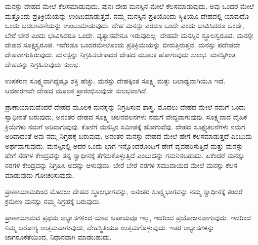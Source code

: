 ಮನಸ್ಸು ದೇಹದ ಮೇಲೆ ಕೆಲಸಮಾಡುವುದು, ಪುನಃ ದೇಹ ಮನಸ್ಸಿನ ಮೇಲೆ ಕೆಲಸಮಾಡುವುದು, ಅವು ಒಂದರ ಮೇಲೆ ಮತ್ತೊಂದು ಪ್ರತಿಕ್ರಿಯೆಯನ್ನು ಉಂಟುಮಾಡುತ್ತವೆ. ನಮ್ಮ ಮನಸ್ಸಿನ ಪ್ರತಿಯೊಂದು ಸ್ಥಿತಿಯೂ ದೇಹದಲ್ಲಿ ಯಾವುದೊ ಒಂದು ಬದಲಾವಣೆಯನ್ನು ಉಂಟುಮಾಡುವುದು. ದೇಹ ಮನಸ್ಸು ಎರಡೂ ಒಂದೇ ಎಂದು ಭಾವಿಸಿದರೂ ಒಂದೇ, ಬೇರೆ ಬೇರೆ ಎಂದು ಭಾವಿಸಿದರೂ ಒಂದೇ. ವ್ಯತ್ಯಾಸವೇನೂ ಇರುವುದಿಲ್ಲ. ದೇಹವೇ ಮನಸ್ಸಿನ ಸ್ಥೂಲಸ್ವರೂಪ. ಮನಸ್ಸೇ ದೇಹದ ಸೂಕ್ಷ್ಮಸ್ವರೂಪ. ಇವೆರಡೂ ಒಂದರಮೇಲೊಂದು ಪ್ರತಿಕ್ರಿಯೆಯನ್ನು ಬೀರುತ್ತಿರುತ್ತವೆ. ಮನಸ್ಸು ಪದೇಪದೇ ದೇಹವಾಗುತ್ತಿರುವುದು. ಮನಸ್ಸನ್ನು ನಿಗ್ರಹಿಸಬೇಕಾದರೆ ದೇಹದ ಮೂಲಕ ಹೋಗುವುದು ಸುಲಭ. ಮನಸ್ಸಿಗಿಂತ ದೇಹವನ್ನು ನಿಗ್ರಹಿಸುವುದು ಸುಲಭ.

ಉಪಕರಣ ಸೂಕ್ಷ್ಮವಾಗಿದ್ದಷ್ಟೂ ಶಕ್ತಿ ಹೆಚ್ಚು. ಮನಸ್ಸು ದೇಹಕ್ಕಿಂತ ಸೂಕ್ಷ್ಮ ಮತ್ತು ಬಲಾಢ್ಯವಾಗಿಯೂ ಇದೆ. ಆದಕಾರಣವೇ ದೇಹದ ಮೂಲಕ ಪ್ರಾರಂಭಿಸುವುದೇ ಸುಲಭವಾಗಿದೆ.

ಪ್ರಾಣಾಯಾಮವೆಂದರೆ ದೇಹದ ಮೂಲಕ ಮನಸ್ಸನ್ನು ನಿಗ್ರಹಿಸುವ ಶಾಸ್ತ್ರ. ಮೊದಲು ದೇಹದ ಮೇಲೆ ನಮಗೆ ಒಂದು ಸ್ವಾಧೀನತೆ ಬರುವುದು, ಅನಂತರ ದೇಹದ ಸೂಕ್ಷ್ಮ ಚಲನವಲನಗಳು ನಮಗೆ ವೇದ್ಯವಾಗುವುವು. ಸೂಕ್ಷ್ಮವಾದ ದೈಹಿಕ ಕ್ರಿಯೆಗಳು ನಮಗೆ ಅರಿವಾಗುವುವು. ಕೊನೆಗೆ ಮನಸ್ಸಿನ ಸಮೀಪಕ್ಕೆ ಹೋಗುವೆವು. ದೇಹದ ಸೂಕ್ಷ್ಮಚಲನೆಗಳು ನಮಗೆ ಅರಿವಾದಂತೆ ಅವು ನಮ್ಮ ನಿಗ್ರಹಕ್ಕೆ ಬರುವುವು. ಅನಂತರ ಮನಸ್ಸು ದೇಹದ ಮೇಲೆ ಹೇಗೆ ಕೆಲಸಮಾಡುತ್ತದೆ ಎಂಬುದು ಅರ್ಥವಾಗುವುದು. ಮನಸ್ಸಿನಲ್ಲಿ ಅದರ ಒಂದು ಭಾಗ ಇನ್ನೊಂದರೊಂದಿಗೆ ಹೇಗೆ ವ್ಯವಹರಿಸುತ್ತಿದೆ ಮತ್ತು ಮನಸ್ಸು ಹೇಗೆ ನರಗಳ ಕೇಂದ್ರವನ್ನು ತನ್ನ ಸ್ವಾಧೀನಕ್ಕೆ ತೆಗೆದುಕೊಳ್ಳುತ್ತಿದೆ ಎಂಬುದನ್ನು ಗಮನಿಸಬಹುದು. ಏಕೆಂದರೆ ಮನಸ್ಸು ನರಗಳ ಕೇಂದ್ರವನ್ನು ನಿಗ್ರಹಿಸಿ ಅದನ್ನು ಆಳುವುದು. ಬೇರೆ ಬೇರೆ ನರಗಳ ಸಮುದಾಯದ ಮೇಲೆ ಮನಸ್ಸು ಕೆಲಸ ಮಾಡುವುದು ಗೋಚರಿಸುವುದು.

ಪ್ರಾಣಾಯಾಮದಿಂದ ಮೊದಲು ದೇಹದ ಸ್ಥೂಲಭಾಗವನ್ನು, ಅನಂತರ ಸೂಕ್ಷ್ಮಭಾಗವನ್ನು ನಮ್ಮ ಸ್ವಾಧೀನಕ್ಕೆ ತಂದರೆ ಕ್ರಮೇಣ ಮನಸ್ಸು ನಮ್ಮ ನಿಗ್ರಹಕ್ಕೆ ಬರುವುದು.

ಪ್ರಾಣಾಯಾಮದ ಪ್ರಥಮ ಅಭ್ಯಾಸಗಳಿಂದ ಯಾವ ಅಪಾಯವೂ ಇಲ್ಲ, ಇದರಿಂದ ಪ್ರಯೋಜನವಾಗುವುದು. ಇದರಿಂದ ನಿಮ್ಮ ಆರೋಗ್ಯ ಉತ್ತಮವಾಗುವುದು, ದೇಹಸ್ಥಿತಿಯೂ ಉತ್ತಮಗೊಳ್ಳುವುದು. ಇತರ ಅಭ್ಯಾಸಗಳನ್ನು ಜಾಗರೂಕತೆಯಿಂದ, ನಿಧಾನವಾಗಿ ಮಾಡಬಹುದು.

